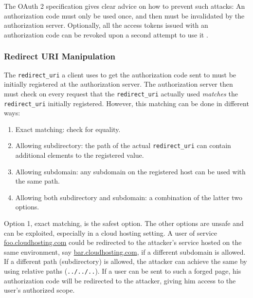 The OAuth 2 specification gives clear advice on how to prevent such attacks: An authorization code must only be used once, and then must be invalidated by the authorization server. Optionally, all the access tokens issued with an authorization code can be revoked upon a second attempt to use it \cite[section 4.1.3]{RFC6749}.

\subsubsection{Redirect URI Manipulation}

The \texttt{redirect\_uri} a client uses to get the authorization code sent to must be initially registered at the authorization server. The authorization server then must check on every request that the \texttt{redirect\_uri} actually used \textit{matches} the \texttt{redirect\_uri} initially registered. However, this matching can be done in different ways:

\begin{enumerate}
    \item Exact matching: check for equality.
    \item Allowing subdirectory: the path of the actual \texttt{redirect\_uri} can contain additional elements to the registered value.
    \item Allowing subdomain: any subdomain on the registered host can be used with the same path.
    \item Allowing both subdirectory and subdomain: a combination of the latter two options.
\end{enumerate}

Option 1, exact matching, is the safest option. The other options are unsafe and can be exploited, especially in a cloud hosting setting. A user of service \url{foo.cloudhosting.com} could be redirected to the attacker's service hosted on the same environment, say \url{bar.cloudhosting.com}, if a different subdomain is allowed. If a different path (subdirectory) is allowed, the attacker can achieve the same by using relative paths (\texttt{../../..}). If a user can be sent to such a forged page, his authorization code will be redirected to the attacker, giving him access to the user's authorized scope.
